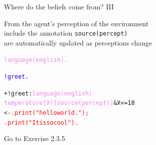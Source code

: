 \documentclass[compress]{beamer}
\newcommand{\link}[2]{\href{#1}{\underline{\textcolor{blue}{#2}}}}
\newcommand{\planhead}[1]{\textcolor{indiagreen}{#1}}
\newcommand{\desire}[1]{\textcolor{blue}{#1}}
\newcommand{\instruction}[1]{\textcolor{red}{#1}}
\newcommand{\belief}[1]{\textcolor{violet}{#1}}
\begin{document}
\begin{frame}[fragile]{Where do the beliefs come from? III}

   
   From the agent's perception of the environment\\ 
   
   
   \scriptsize
   include the annotation \texttt{source(percept)}\\
   are automatically updated as perceptions change\\
   
   \begin{alltt}\scriptsize
     \belief{language(english).}
     
     \desire{!greet.}

     \planhead{+!greet} : \belief{language(english)} 
               \belief{temperature(X)[source(percept)]} \& X <= 10 
        <- \instruction{.print("hello world.");}
           \instruction{.print("It is so cool").}
 
   \end{alltt}

   
   \vfill
   
   {\tiny Go to Exercise 2.3.5}
 
\end{frame}
\end{document}
